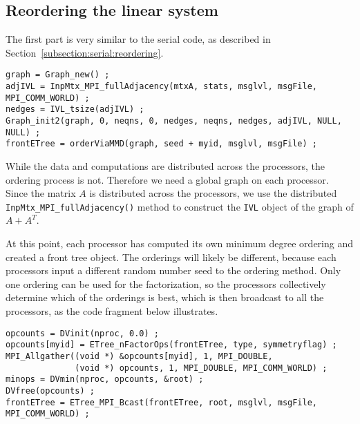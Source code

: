 \subsection{Reordering the linear system}
\label{subsection:MPI:reordering}
\par
The first part is very similar to the serial code, as described in
Section~\ref{subsection:serial:reordering}.
\begin{verbatim}
graph = Graph_new() ;
adjIVL = InpMtx_MPI_fullAdjacency(mtxA, stats, msglvl, msgFile, MPI_COMM_WORLD) ;
nedges = IVL_tsize(adjIVL) ;
Graph_init2(graph, 0, neqns, 0, nedges, neqns, nedges, adjIVL, NULL, NULL) ;
frontETree = orderViaMMD(graph, seed + myid, msglvl, msgFile) ;
\end{verbatim}
While the data and computations are distributed across the
processors, the ordering process is not.
Therefore we need a global graph on each processor.
Since the matrix $A$ is distributed across the processors, 
we use the distributed {\tt InpMtx\_MPI\_fullAdjacency()} method 
to construct the {\tt IVL} object of the graph of $A + A^T$.
\par
At this point, each processor has computed its own minimum degree
ordering and created a front tree object.
The orderings will likely be different, because each processors
input a different random number seed to the ordering method.
Only one ordering can be used for the factorization, so the
processors collectively determine which of the orderings is best, 
which is then broadcast to all the processors, as the code fragment
below illustrates.
\begin{verbatim}
opcounts = DVinit(nproc, 0.0) ;
opcounts[myid] = ETree_nFactorOps(frontETree, type, symmetryflag) ;
MPI_Allgather((void *) &opcounts[myid], 1, MPI_DOUBLE,
              (void *) opcounts, 1, MPI_DOUBLE, MPI_COMM_WORLD) ;
minops = DVmin(nproc, opcounts, &root) ;
DVfree(opcounts) ;
frontETree = ETree_MPI_Bcast(frontETree, root, msglvl, msgFile, MPI_COMM_WORLD) ;
\end{verbatim}
\par
